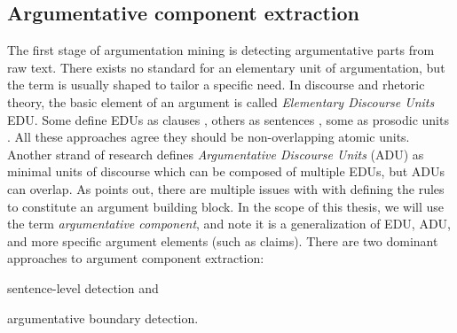 % 

\subsection{Argumentative component extraction}

The first stage of argumentation mining is detecting argumentative parts from
raw text.  There exists no standard for an elementary unit of argumentation,
but the term is usually shaped to tailor a specific need. In discourse and
rhetoric theory, the basic element of an argument is called \textit{Elementary
Discourse Units} EDU. Some define EDUs as clauses \citep{winter1982towards,
givon1983topic}, others as sentences \citep{polanyi1996linguistic}, some as
prosodic units \citep{sacks1978simplest}. All these approaches agree they
should be non-overlapping atomic units. Another strand of research defines
\textit{Argumentative Discourse Units} (ADU) as minimal units of discourse
\citep{peldszus2013argument} which can be composed of multiple EDUs, but ADUs
can overlap.  As \citep{lawrence2019argument} points out, there are multiple
issues with with defining the rules to constitute an argument building block.
In the scope of this thesis, we will use the term \emph{argumentative
component}, and note it is a generalization of EDU, ADU, and more specific
argument elements (such as claims).
There are two dominant approaches to argument component extraction:
\begin{enumerate*}
		\item sentence-level detection and
		\item argumentative boundary detection.
\end{enumerate*}

